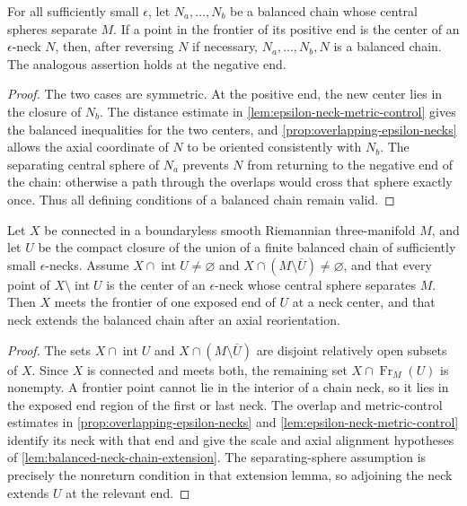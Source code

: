 \begin{lemma}
\label{lem:balanced-neck-chain-extension}
\notready
For all sufficiently small $\epsilon$, let
$N_a,\ldots,N_b$ be a balanced chain whose central spheres separate $M$.
If a point in the frontier of its positive end is the center of an
$\epsilon$-neck $N$, then, after reversing $N$ if necessary,
$N_a,\ldots,N_b,N$ is a balanced chain.  The analogous assertion holds at
the negative end.
\end{lemma}

\begin{proof}
The two cases are symmetric.  At the positive end, the new center lies in
the closure of $N_b$.  The distance estimate in
\ref{lem:epsilon-neck-metric-control} gives the balanced inequalities for
the two centers, and \ref{prop:overlapping-epsilon-necks} allows the axial
coordinate of $N$ to be oriented consistently with $N_b$.  The separating
central sphere of $N_a$ prevents $N$ from returning to the negative end of
the chain: otherwise a path through the overlaps would cross that sphere
exactly once.  Thus all defining conditions of a balanced chain remain
valid.
\end{proof}

\begin{lemma}
\label{lem:finite-neck-chain-frontier-dichotomy}
\notready
Let $X$ be connected in a boundaryless smooth Riemannian three-manifold $M$,
and let $U$ be the compact closure of the union of a finite balanced chain of
sufficiently small $\epsilon$-necks.  Assume
$X\cap\operatorname{int}U\ne\varnothing$ and
$X\cap(M\setminus\overline U)\ne\varnothing$, and that every point of
$X\setminus\operatorname{int}U$ is the center of an $\epsilon$-neck whose
central sphere separates $M$.  Then $X$ meets the frontier of one exposed end
of $U$ at a neck center, and that neck extends the balanced chain after an
axial reorientation.
\end{lemma}

\begin{proof}
The sets $X\cap\operatorname{int}U$ and
$X\cap(M\setminus\overline U)$ are disjoint relatively open subsets of $X$.
Since $X$ is connected and meets both, the remaining set
$X\cap\operatorname{Fr}_M(U)$ is nonempty.  A frontier point cannot lie in
the interior of a chain neck, so it lies in the exposed end region of the
first or last neck.  The overlap and metric-control estimates in
\ref{prop:overlapping-epsilon-necks} and
\ref{lem:epsilon-neck-metric-control} identify its neck with that end and
give the scale and axial alignment hypotheses of
\ref{lem:balanced-neck-chain-extension}.  The separating-sphere assumption
is precisely the nonreturn condition in that extension lemma, so adjoining
the neck extends $U$ at the relevant end.
\end{proof}

